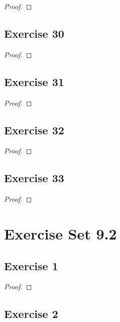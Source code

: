 \documentclass[14pt]{extarticle}
\begin{document}
\begin{proof}

\end{proof}

\subsection{Exercise 30}

\begin{proof}

\end{proof}

\subsection{Exercise 31}

\begin{proof}

\end{proof}

\subsection{Exercise 32}

\begin{proof}

\end{proof}

\subsection{Exercise 33}

\begin{proof}

\end{proof}

\section{Exercise Set 9.2}

\subsection{Exercise 1}

\begin{proof}

\end{proof}

\subsection{Exercise 2}
\end{document}
